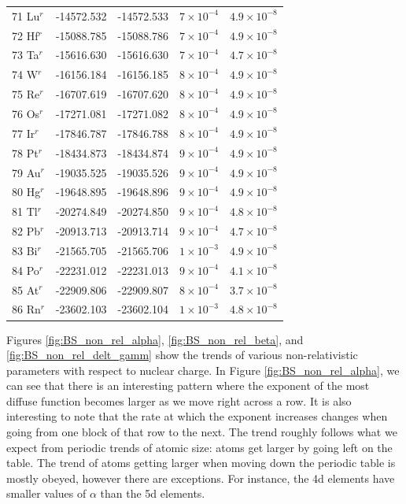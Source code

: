\begin{longtable}{l r r r r}
71 Lu$^{r}$ &   -14572.532        & -14572.533        &   $7\times10^{-4}$      &   $4.9\times10^{-8}$    \\
72 Hf$^{r}$ &   -15088.785        & -15088.786        &   $7\times10^{-4}$      &   $4.9\times10^{-8}$    \\
73 Ta$^{r}$ &   -15616.630        & -15616.630        &   $7\times10^{-4}$      &   $4.7\times10^{-8}$    \\
74 W$^{r}$  &   -16156.184        & -16156.185        &   $8\times10^{-4}$      &   $4.9\times10^{-8}$    \\
75 Re$^{r}$ &   -16707.619        & -16707.620        &   $8\times10^{-4}$      &   $4.9\times10^{-8}$    \\
76 Os$^{r}$ &   -17271.081        & -17271.082        &   $8\times10^{-4}$      &   $4.9\times10^{-8}$    \\
77 Ir$^{r}$ &   -17846.787        & -17846.788        &   $8\times10^{-4}$      &   $4.9\times10^{-8}$    \\
78 Pt$^{r}$ &   -18434.873        & -18434.874        &   $9\times10^{-4}$      &   $4.9\times10^{-8}$    \\
79 Au$^{r}$ &   -19035.525        & -19035.526        &   $9\times10^{-4}$      &   $4.9\times10^{-8}$    \\
80 Hg$^{r}$ &   -19648.895        & -19648.896        &   $9\times10^{-4}$      &   $4.9\times10^{-8}$    \\
81 Tl$^{r}$ &   -20274.849        & -20274.850        &   $9\times10^{-4}$      &   $4.8\times10^{-8}$    \\
82 Pb$^{r}$ &   -20913.713        & -20913.714        &   $9\times10^{-4}$      &   $4.7\times10^{-8}$    \\
83 Bi$^{r}$ &   -21565.705        & -21565.706        &   $1\times10^{-3}$      &   $4.9\times10^{-8}$    \\
84 Po$^{r}$ &   -22231.012        & -22231.013        &   $9\times10^{-4}$      &   $4.1\times10^{-8}$    \\
85 At$^{r}$ &   -22909.806        & -22909.807        &   $8\times10^{-4}$      &   $3.7\times10^{-8}$    \\
86 Rn$^{r}$ &   -23602.103        & -23602.104        &   $1\times10^{-3}$      &   $4.8\times10^{-8}$    \\
\bottomrule  	
\end{longtable} 

Figures \ref{fig:BS_non_rel_alpha}, \ref{fig:BS_non_rel_beta}, and \ref{fig:BS_non_rel_delt_gamm} show the trends of various non-relativistic parameters with respect to nuclear charge. In Figure  \ref{fig:BS_non_rel_alpha}, we can see that there is an interesting pattern where the exponent of the most diffuse function becomes larger as we move right across a row. It is also interesting to note that the rate at which the exponent increases changes when going from one block of that row to the next. The trend roughly follows what we expect from periodic trends of atomic size: atoms get larger by going left on the table. The trend of atoms getting larger when moving down the periodic table is mostly obeyed, however there are exceptions. For instance, the 4d elements have smaller values of $\alpha$ than the 5d elements.

